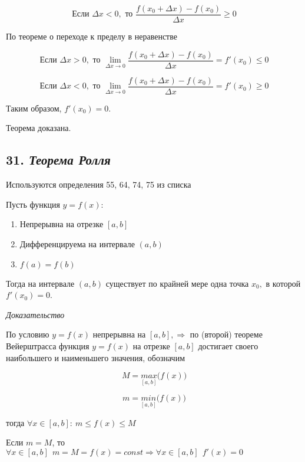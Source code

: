 $$
\text{Если } \Delta x < 0, \text{ то }{\dfrac{f(x_0+\Delta x) - f(x_0)}{\Delta x}} \geqslant 0
$$

По теореме о переходе к пределу в неравенстве

$$
\text{Если } \Delta x > 0, \text{ то } \lim\limits_{\Delta x \rightarrow 0}{\dfrac{f(x_0 + \Delta x) - f(x_0)}{\Delta x}} = f'(x_0) \leqslant 0
$$

$$
\text{Если } \Delta x < 0, \text{ то }\lim\limits_{\Delta x \rightarrow 0}{\dfrac{f(x_0 + \Delta x) - f(x_0)}{\Delta x}} = f'(x_0) \geqslant 0
$$

Таким образом, $f'(x_0) = 0$.

Теорема доказана.
\newpage 
\subsection*{31. \textit{Теорема Ролля}}
\begin{Quote2} 
\small\centering 

Используются определения 55, 64, 74, 75 из списка \end{Quote2} 

Пусть функция $y = f(x):$
\begin{enumerate}

\item Непрерывна на отрезке $[a, b]$
\item Дифференцируема на интервале $(a, b)$
\item $f(a) = f(b)$

\end{enumerate}

Тогда на интервале $(a, b)$ существует по крайней мере одна точка $x_0,$ в которой $f'(x_0) = 0$.
\vspace*{20pt} 

\textit{Доказательство}

По условию $y = f(x)$ непрерывна на $[a, b], \Rightarrow $ по (второй) теореме Вейерштрасса функция $y = f(x)$ на отрезке $[a,b]$ достигает своего наибольшего и наименьшего значения, обозначим

$$
M = \underset{[a, b]}{max}\big(f(x)\big)
$$

$$
m = \underset{[a, b]}{min}\big(f(x)\big)
$$

тогда $\forall x \in [a, b] : \ m \leqslant f(x) \leqslant M$

Если $m = M$, то $\forall x \in [a, b] \ \ m = M = f(x) = const \Rightarrow \forall x \in [a, b] \ \ f'(x) = 0$

